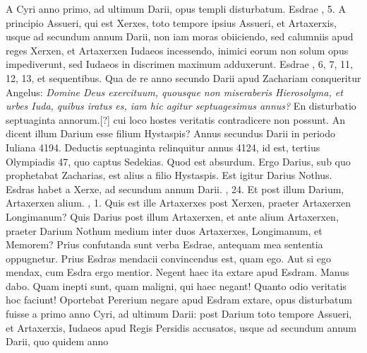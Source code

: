 A Cyri anno primo, ad ultimum Darii, opus
templi disturbatum.
Esdrae , 5.
A principio Assueri, qui est
Xerxes, toto tempore ipsius Assueri, et Artaxerxis, usque ad secundum
annum Darii, non iam moras obiiciendo, sed calumniis apud
reges Xerxen, et Artaxerxen Iudaeos incessendo, inimici eorum
non solum opus impediverunt, sed Iudaeos in discrimen maximum
adduxerunt.
Esdrae , 6, 7, 11, 12, 13, et sequentibus.
Qua de re
anno secundo Darii apud Zachariam conqueritur Angelus: \textit{Domine
Deus exercituum, quousque non miseraberis Hierosolyma, et
urbes Iuda, quibus iratus es, iam hic agitur septuagesimus annus?}
En disturbatio septuaginta annorum.[?] cui loco hostes
 veritatis contradicere
non possunt.
An dicent illum Darium esse filium Hystaspis?
Annus secundus Darii in periodo Iuliana 4194. Deductis septuaginta
relinquitur annus 4124, id est, tertius Olympiadis 47,
quo captus Sedekias.
Quod est absurdum.
Ergo Darius, sub quo
prophetabat Zacharias, est alius a filio Hystaspis.
Est igitur Darius
Nothus.
Esdras habet a Xerxe, ad secundum annum Darii.
, 24.
Et post illum Darium, Artaxerxen alium.
, 1.
Quis
est ille Artaxerxes post Xerxen, praeter Artaxerxen Longimanum?
Quis Darius post illum Artaxerxen, et ante alium Artaxerxen, praeter
Darium Nothum medium inter duos Artaxerxes, Longimanum,
et Memorem?
Prius confutanda sunt verba Esdrae, antequam
mea sententia oppugnetur.
Prius Esdras mendacii convincendus
est, quam ego.
Aut si ego mendax, cum Esdra ergo mentior.
Negent haec ita extare apud Esdram.
Manus dabo.
Quam inepti
sunt, quam maligni, qui haec negant!
Quanto odio veritatis hoc faciunt!
Oportebat Pererium negare apud Esdram extare, opus disturbatum
fuisse a primo anno Cyri, ad ultimum Darii: post Darium
toto tempore Assueri, et Artaxerxis, Iudaeos apud Regis Persidis
accusatos, usque ad secundum annum Darii, quo quidem anno
